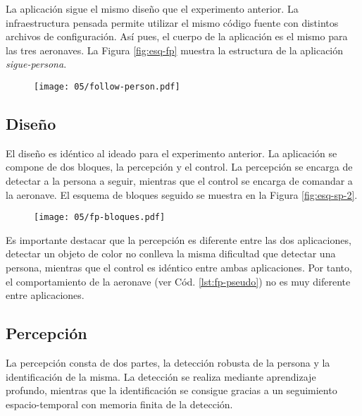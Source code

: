\documentclass[../main.tex]{subfiles}
\begin{document}
La aplicación sigue el mismo diseño que el experimento anterior. La infraestructura pensada permite utilizar el mismo código fuente con distintos archivos de configuración. Así pues, el cuerpo de la aplicación es el mismo para las tres aeronaves. La Figura \ref{fig:esq-fp} muestra la estructura de la aplicación \emph{sigue-persona}.

\begin{figure}[!ht]
 	{\texttt{[image: 05/follow-person.pdf]}}
\end{figure}

\subsection*{Diseño}
El diseño es idéntico al ideado para el experimento anterior. La aplicación se compone de dos bloques, la percepción y el control. La percepción se encarga de detectar a la persona a seguir, mientras que el control se encarga de comandar a la aeronave. El esquema de bloques seguido se muestra en la Figura \ref{fig:esq-sp-2}.

\begin{figure}[!ht]
 	{\texttt{[image: 05/fp-bloques.pdf]}}
\end{figure}

Es importante destacar que la percepción es diferente entre las dos aplicaciones, detectar un objeto de color no conlleva la misma dificultad que detectar una persona, mientras que el control es idéntico entre ambas aplicaciones. Por tanto, el comportamiento de la aeronave (ver Cód. \ref{lst:fp-pseudo}) no es muy diferente entre aplicaciones.



\subsection*{Percepción}
La percepción consta de dos partes, la detección robusta de la persona y la identificación de la misma. La detección se realiza mediante aprendizaje profundo, mientras que la identificación se consigue gracias a un seguimiento espacio-temporal con memoria finita de la detección.
\end{document}
